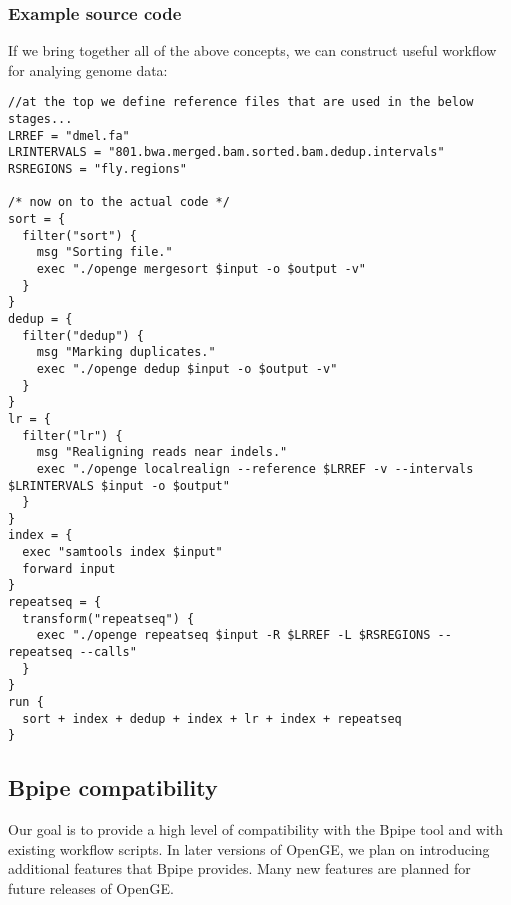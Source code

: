 \documentclass[11pt]{article}
\begin{document}
\subsubsection{Example source code}
If we bring together all of the above concepts, we can construct useful workflow for analying genome data:
\begin{verbatim}
//at the top we define reference files that are used in the below stages...
LRREF = "dmel.fa"
LRINTERVALS = "801.bwa.merged.bam.sorted.bam.dedup.intervals"
RSREGIONS = "fly.regions"

/* now on to the actual code */
sort = {
  filter("sort") {
    msg "Sorting file."
    exec "./openge mergesort $input -o $output -v"
  }
}
dedup = {
  filter("dedup") {
    msg "Marking duplicates."
    exec "./openge dedup $input -o $output -v"
  }
}
lr = {
  filter("lr") {
    msg "Realigning reads near indels."
    exec "./openge localrealign --reference $LRREF -v --intervals $LRINTERVALS $input -o $output"
  }
}
index = {
  exec "samtools index $input"
  forward input
}
repeatseq = {
  transform("repeatseq") {
    exec "./openge repeatseq $input -R $LRREF -L $RSREGIONS --repeatseq --calls"
  }
}
run {
  sort + index + dedup + index + lr + index + repeatseq
}
\end{verbatim}

\subsection {Bpipe compatibility}
Our goal is to provide a high level of compatibility with the Bpipe tool and with existing workflow scripts. In later versions of OpenGE, we plan on introducing additional features that Bpipe provides. Many new features are planned for future releases of OpenGE.
\end{document}
